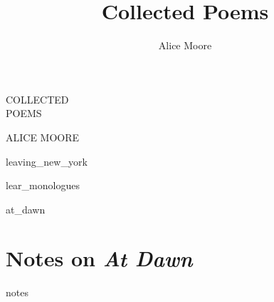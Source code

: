 \documentclass[ebook, twoside,openright, final]{memoir}
\title{Collected Poems}
\author{Alice Moore}
\date{}
\begin{document}
\setlength\epigraphwidth{5cm}
\setlength\epigraphrule{0pt}
\epigraphfontsize{\footnotesize}

\setlength\vgap{2.5em}

\PlainPoemTitle

\frontmatter
\pagestyle{empty}

\begin{titlingpage}
\begingroup
\newlength{\drop}
\setlength{\drop}{0.12\textheight}
\vspace*{\drop}
\begin{center}
{\noindent\Huge COLLECTED}\\[\baselineskip]
{\Huge POEMS}\par
\vspace*{3\drop}
{\noindent\large \textsc{ALICE MOORE}}
\end{center}
\endgroup
\end{titlingpage}

\let\tocheadstart\relax
\tableofcontents*

\renewcommand{\printbookname}{}
\renewcommand{\printbooknum}{}
\renewcommand{\printpartnum}{}
\renewcommand{\printpartname}{}
\renewcommand{\printchaptername}{}
\renewcommand{\printchapternum}{}

\mainmatter
\pagestyle{myheadings}

{leaving_new_york}

{lear_monologues}

{at_dawn}

\renewcommand\appendixname{Notes}

\appendix

\chapter{Notes on \textit{At Dawn}}
{notes}
\end{document}
